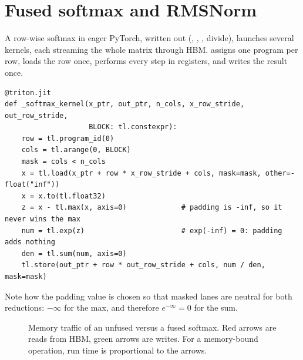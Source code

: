 \section{Fused softmax and RMSNorm}\label{sec:triton:softmax}
A row-wise softmax in eager PyTorch, written out (, ,
, divide), launches several kernels, each streaming the whole matrix through
HBM.  assigns one program per row, loads the row once,
performs every step in registers, and writes the result once.

\begin{lstlisting}[caption={Fused row softmax: one program per row.},label={lst:triton:softmax}]
@triton.jit
def _softmax_kernel(x_ptr, out_ptr, n_cols, x_row_stride, out_row_stride,
                    BLOCK: tl.constexpr):
    row = tl.program_id(0)
    cols = tl.arange(0, BLOCK)
    mask = cols < n_cols
    x = tl.load(x_ptr + row * x_row_stride + cols, mask=mask, other=-float("inf"))
    x = x.to(tl.float32)
    z = x - tl.max(x, axis=0)             # padding is -inf, so it never wins the max
    num = tl.exp(z)                       # exp(-inf) = 0: padding adds nothing
    den = tl.sum(num, axis=0)
    tl.store(out_ptr + row * out_row_stride + cols, num / den, mask=mask)
\end{lstlisting}

Note how the padding value is chosen so that masked lanes are neutral for both
reductions: $-\infty$ for the max, and therefore $e^{-\infty}=0$ for the sum.

\begin{figure}[t]
\centering
{}
\caption{Memory traffic of an unfused versus a fused softmax. Red arrows are reads from
HBM, green arrows are writes. For a memory-bound operation, run time is proportional to
the arrows.}
\label{fig:triton:softmax}
\end{figure}

